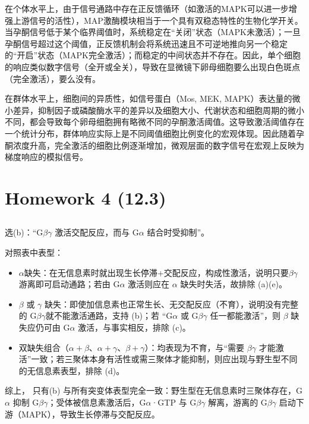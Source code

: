 \documentclass[10pt]{article}
\begin{document}
在个体水平上，由于信号通路中存在正反馈循环（如激活的MAPK可以进一步增强上游信号的活性），MAP激酶模块相当于一个具有双稳态特性的生物化学开关。当孕酮信号低于某个临界阈值时，系统稳定在``关闭''状态（MAPK未激活）；一旦孕酮信号超过这个阈值，正反馈机制会将系统迅速且不可逆地推向另一个稳定的``开启''状态（MAPK完全激活）；而稳定的中间状态并不存在。因此，单个细胞的响应类似数字信号（全开或全关），导致在显微镜下卵母细胞要么出现白色斑点（完全激活），要么没有。

在群体水平上，细胞间的异质性，如信号蛋白（Mos, MEK, MAPK）表达量的微小差异，抑制因子或磷酸酶水平的差异以及细胞大小、代谢状态和细胞周期的微小不同，都会导致每个卵母细胞拥有略微不同的孕酮激活阈值。这导致激活阈值存在一个统计分布，群体响应实际上是不同阈值细胞比例变化的宏观体现。因此随着孕酮浓度升高，完全激活的细胞比例逐渐增加，微观层面的数字信号在宏观上反映为梯度响应的模拟信号。

\newpage

\section{Homework 4 (12.3)}

\subsection{}
选(b)：``G\(\beta\gamma\) 激活交配反应，而与 G\(\alpha\) 结合时受抑制''。

对照表中表型：
\begin{itemize}
    \item \(\alpha\)缺失：在无信息素时就出现生长停滞+交配反应，构成性激活，说明只要\(\beta \gamma\)游离即可启动通路；若由 G\(\alpha\) 激活则应在 \(\alpha\) 缺失时失活，故排除 (a)(e)。
    \item \(\beta\) 或 \(\gamma\) 缺失：即使加信息素也正常生长、无交配反应（不育），说明没有完整的 G\(\beta\gamma\)就不能激活通路，支持 (b)；若 ``G\(\alpha\) 或 G\(\beta\gamma\) 任一都能激活''，则 \(\beta\) 缺失应仍可由 G\(\alpha\) 激活，与事实相反，排除 (c)。
    \item 双缺失组合（\(\alpha+\beta\)、\(\alpha+\gamma\)、\(\beta+\gamma\)）：均表现为不育，与``需要 \(\beta \gamma\) 才能激活''一致；若三聚体本身有活性或需三聚体才能抑制，则应出现与野生型不同的无信息素表型，排除 (d)。
\end{itemize}
综上， 只有(b) 与所有突变体表型完全一致：野生型在无信息素时三聚体存在，G\(\alpha\) 抑制 G\(\beta \gamma\)；受体被信息素激活后，G\(\alpha\)·GTP 与 G\(\beta\gamma\) 解离，游离的 G\(\beta\gamma\) 启动下游（MAPK），导致生长停滞与交配反应。
\end{document}
